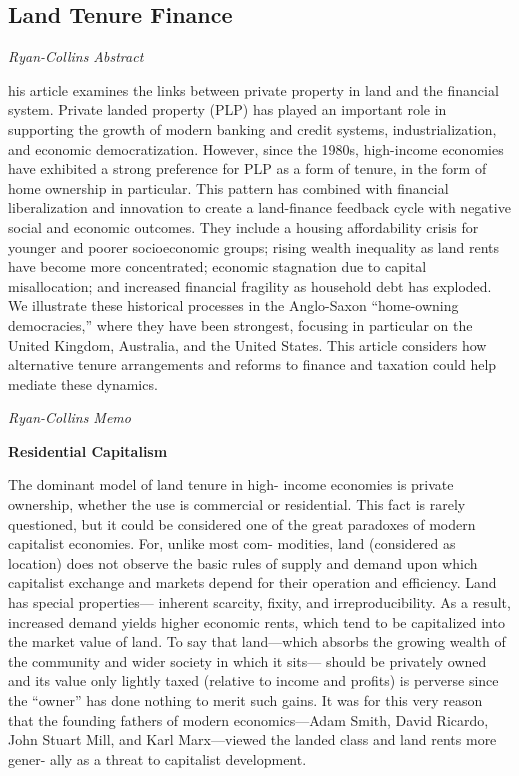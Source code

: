 \documentclass[
]{book}
\begin{document}
\hypertarget{land-tenure-finance}{%
\subsection{Land Tenure Finance}\label{land-tenure-finance}}

\emph{Ryan-Collins Abstract}

his article examines the links between private property in land and the financial system. Private landed property (PLP) has played an important role in supporting the growth of modern banking and credit systems, industrialization, and economic democratization. However, since the 1980s, high-income economies have exhibited a strong preference for PLP as a form of tenure, in the form of home ownership in particular. This pattern has combined with financial liberalization and innovation to create a land-finance feedback cycle with negative social and economic outcomes. They include a housing affordability crisis for younger and poorer socioeconomic groups; rising wealth inequality as land rents have become more concentrated; economic stagnation due to capital misallocation; and increased financial fragility as household debt has exploded. We illustrate these historical processes in the Anglo-Saxon ``home-owning democracies,'' where they have been strongest, focusing in particular on the United Kingdom, Australia, and the United States. This article considers how alternative tenure arrangements and reforms to finance and taxation could help mediate these dynamics.

\emph{Ryan-Collins Memo}

\textbf{Residential Capitalism}

The dominant model of land tenure in high-­
income economies is
private ownership, whether the use is commercial or residential. This
fact is rarely questioned, but it could be considered one of the great
paradoxes of modern capitalist economies. For, unlike most com-
modities, land (considered as location) does not observe the basic
rules of supply and demand upon which capitalist exchange and
markets depend for their operation and efficiency. Land has special
properties---­
inherent scarcity, fixity, and irreproducibility.
As a result, increased demand yields higher economic rents,
which tend to be capitalized into the market value of land.
To say that land---­which absorbs the
growing wealth of the community and wider society in which it sits---­
should be privately owned and its value only lightly taxed (relative to
income and profits) is perverse since the ``owner'' has done nothing to
merit such gains. It was for this very reason that the founding fathers
of modern economics---­Adam Smith, David Ricardo, John Stuart Mill,
and Karl Marx---­viewed the landed class and land rents more gener-
ally as a threat to capitalist development.
\end{document}
